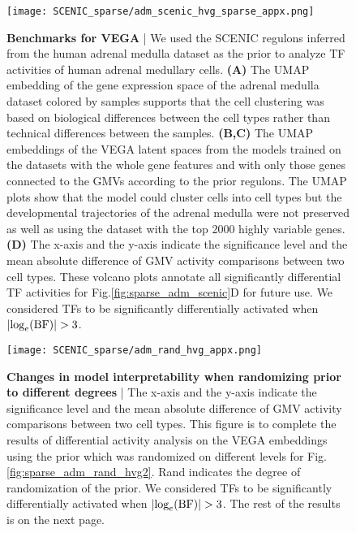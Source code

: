 \begin{figure}[b!]
    \centering
    \hspace*{-4mm}
    \texttt{[image: SCENIC\_sparse/adm\_scenic\_hvg\_sparse\_appx.png]}
    \caption{\small{\textbf{Benchmarks for VEGA} | We used the SCENIC regulons inferred from the human adrenal medulla dataset as the prior to analyze TF activities of human adrenal medullary cells. \textbf{(A)} The UMAP embedding of the gene expression space of the adrenal medulla dataset colored by samples supports that the cell clustering was based on biological differences between the cell types rather than technical differences between the samples. \textbf{(B,C)} The UMAP embeddings of the VEGA latent spaces from the models trained on the datasets with the whole gene features and with only those genes connected to the GMVs according to the prior regulons. The UMAP plots show that the model could cluster cells into cell types but the developmental trajectories of the adrenal medulla were not preserved as well as using the dataset with the top 2000 highly variable genes. \textbf{(D)} The x-axis and the y-axis indicate the significance level and the mean absolute difference of GMV activity comparisons between two cell types. These volcano plots annotate all significantly differential TF activities for Fig.\ref{fig:sparse_adm_scenic}D for future use. We considered TFs to be significantly differentially activated when $|\textnormal{log}_e(\textnormal{BF})|>3$.}}
    \label{fig:sparse_adm_scenic_appx}
\end{figure}

\begin{figure}[h!]
    \centering
    \hspace*{-17mm}
    \texttt{[image: SCENIC\_sparse/adm\_rand\_hvg\_appx.png]}
    \caption{\small{\textbf{Changes in model interpretability when randomizing prior to different degrees} | The x-axis and the y-axis indicate the significance level and the mean absolute difference of GMV activity comparisons between two cell types. This figure is to complete the results of differential activity analysis on the VEGA embeddings using the prior which was randomized on different levels for Fig.\ref{fig:sparse_adm_rand_hvg2}. Rand indicates the degree of randomization of the prior. We considered TFs to be significantly differentially activated when $|\textnormal{log}_e(\textnormal{BF})|>3$. The rest of the results is on the next page.}}
    \label{fig:sparse_adm_rand_hvg_appx}
\end{figure}


